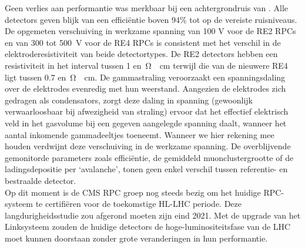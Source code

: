 	Geen verlies aan performantie was merkbaar bij een achtergrondruis van . Alle detectors geven blijk van een efficiëntie boven 94\% tot op de vereiste ruisniveaus. De opgemeten verschuiving in werkzame spanning van 100 V voor de RE2 RPCs en van 300 tot \SI{500}{V} voor de RE4 RPCs is consistent met het verschil in de elektroderesistiviteit van beide detectortypes. De RE2 detectors hebben een resistiviteit in het interval tussen 1 en \,\si{\ohm\cdot cm} terwijl die van de nieuwere RE4 ligt tussen 0.7 en \,\si{\ohm\cdot cm}. De gammastraling veroorzaakt een spanningsdaling over de elektrodes evenredig met hun weerstand. Aangezien de elektrodes zich gedragen als condensators, zorgt deze daling in spanning (gewoonlijk verwaarloosbaar bij afwezigheid van straling) ervoor dat het effectief elektrisch veld in het gasvolume bij een gegeven aangelegde spanning daalt, wanneer het aantal inkomende gammadeeltjes toeneemt. Wanneer we hier rekening mee houden verdwijnt deze verschuiving in de werkzame spanning. De overblijvende gemonitorde parameters zoals efficiëntie, de gemiddeld muonclustergrootte of de ladingsdepositie per ‘avalanche’, tonen geen enkel verschil tussen referentie- en bestraalde detector.\\
	Op dit moment is de CMS RPC groep nog steeds bezig om het huidige RPC-systeem te certifiëren voor de toekomstige HL-LHC periode. Deze langdurigheidsstudie zou afgerond moeten zijn eind 2021. Met de upgrade van het Linksysteem zouden de huidige detectors de hoge-luminositeitsfase van de LHC moet kunnen doorstaan zonder grote veranderingen in hun performantie.

\clearpage{\pagestyle{empty}\cleardoublepage}


